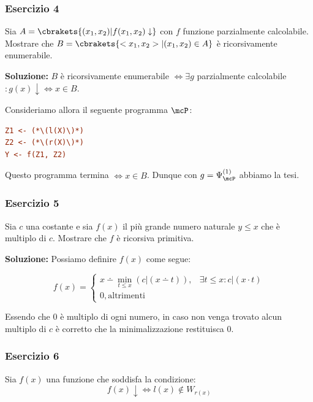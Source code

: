 \subsubsection{Esercizio 4}

Sia \(A = \cbrakets{(x_1, x_2) \vert f(x_1, x_2) \downarrow}\) con \(f\) funzione parzialmente calcolabile. Mostrare che \(B=\cbrakets{<x_1, x_2> \vert (x_1, x_2) \in A}\) è ricorsivamente enumerabile.

\textbf{Soluzione:} \(B\) è ricorsivamente enumerabile \(\iff \exists g\) parzialmente calcolabile \(: g(x) \downarrow \iff x \in B\).

Consideriamo allora il seguente programma \(\mcP\):

\begin{lstlisting}[language=ini, caption={ }]
Z1 <- (*\(l(X)\)*)
Z2 <- (*\(r(X)\)*)
Y <- f(Z1, Z2)
\end{lstlisting}

Questo programma termina \(\iff x \in B\). Dunque con \(g=\Psi_{\mcP}^{(1)}\) abbiamo la tesi.

\subsubsection{Esercizio 5}

Sia \(c\) una costante e sia \(f(x)\) il più grande numero naturale \(y \leq x\) che è multiplo di \(c\). Mostrare che \(f\) è ricorsiva primitiva.

\textbf{Soluzione:} Possiamo definire \(f(x)\) come segue:

\begin{equation}
  f(x) =\begin{cases}
    x \dotminus \min_{t \leq x} (c \vert (x\dotminus t)), & \exists t \leq x: c\vert (x\cdot t)\\
    0, \text{altrimenti}
    \end{cases}
\end{equation}

Essendo che \(0\) è multiplo di ogni numero, in caso non venga trovato alcun multiplo di \(c\) è corretto che la minimalizzazione restituisca \(0\).

\subsubsection{Esercizio 6}

Sia \(f(x)\) una funzione che soddisfa la condizione:
\begin{equation}
  f(x) \downarrow \iff l(x) \nin W_{r(x)}
\end{equation}

